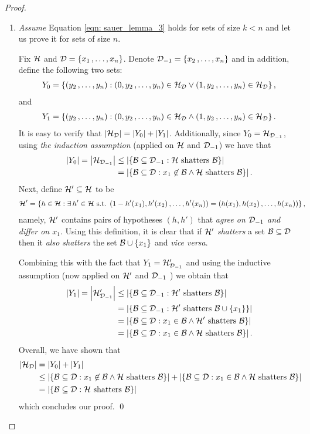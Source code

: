 \documentclass[11pt]{article}
\begin{document}
\begin{itemize}
\begin{proof}
\begin{enumerate}
\item  \emph{Assume} Equation \eqref{eqn: sauer_lemma_3} holds for sets of size $k < n$ and let us prove it for sets of size $n$. 

Fix $\cH$ and $\cD = \set{x_1 \xdotx{,} x_n}$. Denote $\cD_{-1} = \set{x_2 \xdotx{,} x_n}$ and in addition, define the
following two sets:
\begin{align*}
Y_{0} = \set{(y_2 \xdotx{,} y_n): (0, y_2 \xdotx{,} y_n) \in \cH_{\cD} \lor  (1, y_2 \xdotx{,} y_n) \in \cH_{\cD}},
\end{align*}
and
\begin{align*}
Y_{1} = \set{(y_2 \xdotx{,} y_n): (0, y_2 \xdotx{,} y_n) \in \cH_{\cD} \land  (1, y_2 \xdotx{,} y_n) \in \cH_{\cD}}.
\end{align*}
It is easy to verify that $\abs{\cH_{\cD}} = \abs{Y_0} + \abs{Y_1}$. Additionally, since $Y_0 = \cH_{\cD_{-1}}$, using \emph{the induction assumption} (applied on $\cH$ and $\cD_{-1}$) we have that
\begin{align*}
\abs{Y_0} = \abs{\cH_{\cD_{-1}}} &\le \abs{\set{\cB \subseteq \cD_{-1}: \cH\text{ shatters }\cB}} \\
&=  \abs{\set{\cB \subseteq \cD: x_1 \not\in \cB \land \cH\text{ shatters }\cB}}.
\end{align*}
Next, define $\cH' \subseteq \cH$ to be
\begin{align*}
\cH'  &= \set{h \in \cH : \exists\,h' \in \cH\text{ s.t. }(1 - h'(x_1), h'(x_2) \xdotx{,} h'(x_n)) = (h(x_1), h(x_2)  \xdotx{,} h(x_n)) },
\end{align*}
namely, $\cH'$ contains pairs of hypotheses $(h, h')$ that \emph{agree on $\cD_{-1}$ and differ on $x_1$}. Using this definition, it is clear that if $\cH'$ \emph{shatters} a set $\cB \subseteq \cD$ then it \emph{also shatters} the set $\cB \cup \set{x_1}$ and \emph{vice versa}. 

Combining this with the fact that $Y_1 = \cH'_{\cD_{-1}}$ and using the inductive assumption (now applied on $\cH'$ and $\cD_{-1}$ ) we obtain that
\begin{align*}
\abs{Y_1} = \abs{ \cH'_{\cD_{-1}}} &\le \abs{\set{\cB \subseteq \cD_{-1}:  \cH'\text{ shatters }\cB }} \\
&= \abs{\set{\cB \subseteq \cD_{-1}:  \cH'\text{ shatters }\cB\cup\set{x_1} }} \\
&= \abs{\set{\cB \subseteq \cD:  x_1 \in \cB \land \cH'\text{ shatters }\cB }} \\
&= \abs{\set{\cB \subseteq \cD:  x_1 \in \cB \land \cH \text{ shatters }\cB }}.
\end{align*}
Overall, we have shown that
\begin{align*}
\abs{\cH_{\cD}} &= \abs{Y_0} + \abs{Y_1} \\
&\le \abs{\set{\cB \subseteq \cD: x_1 \not\in \cB \land \cH\text{ shatters }\cB}} +  \abs{\set{\cB \subseteq \cD:  x_1 \in \cB \land \cH \text{ shatters }\cB }}\\
&= \abs{\set{\cB \subseteq \cD: \cH\text{ shatters }\cB}}
\end{align*}
which concludes our proof. \qed
\end{enumerate}
\end{proof}
\end{itemize}
\end{document}
